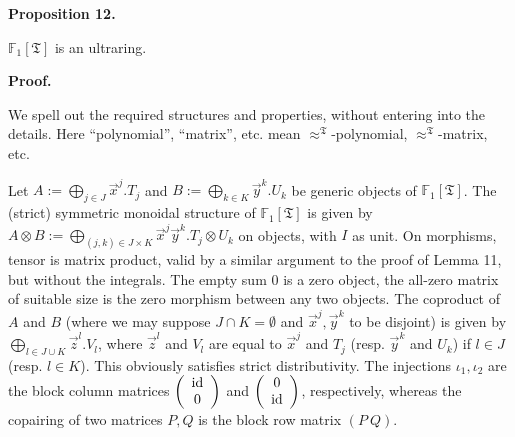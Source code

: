 \par\medskip\noindent\textbf{Proposition 12.}\par
 
 
$\mathbb{F}_{1}[\mathfrak{T}]$ is an ultraring.\par
 
 
 
 
 
\par\medskip\noindent\textbf{Proof.}\par
 
 
We spell out the required structures and properties, without entering into the details. Here “polynomial”, “matrix”, etc. mean $\approx^{\mathfrak{T}}$-polynomial, $\approx^{\mathfrak{T}}$-matrix, etc.\par
 
 
 
Let $A:=\bigoplus_{j\in J}\vec{x}^{j}.T_{j}$ and $B:=\bigoplus_{k\in K}\vec{y}^{k}.U_{k}$ be generic objects of $\mathbb{F}_{1}[\mathfrak{T}]$. The (strict) symmetric monoidal structure of $\mathbb{F}_{1}[\mathfrak{T}]$ is given by $A\otimes B:=\bigoplus_{(j,k)\in J\times K}\vec{x}^{j}\vec{y}^{k}.T_{j}\otimes U%
_{k}$ on objects, with $I$ as unit. On morphisms, tensor is matrix product, valid by a similar argument to the proof of Lemma 11, but without the integrals. The empty sum $0$ is a zero object, the all-zero matrix of suitable size is the zero morphism between any two objects. The coproduct of $A$ and $B$ (where we may suppose $J\cap K=\emptyset$ and $\vec{x}^{j},\vec{y}^{k}$ to be disjoint) is given by $\bigoplus_{l\in J\cup K}\vec{z}^{l}.V_{l}$, where $\vec{z}^{l}$ and $V_{l}$ are equal to $\vec{x}^{j}$ and $T_{j}$ (resp. $\vec{y}^{k}$ and $U_{k}$) if $l\in J$ (resp. $l\in K$). This obviously satisfies strict distributivity. The injections $\iota_{1},\iota_{2}$ are the block column matrices $\left(\begin{array}[]{c}\mathrm{id}\\
0\end{array}\right)$ and $\left(\begin{array}[]{c}0\\
\mathrm{id}\end{array}\right)$, respectively, whereas the copairing of two matrices $P,Q$ is the block row matrix $(P\ Q)$.\par
 

